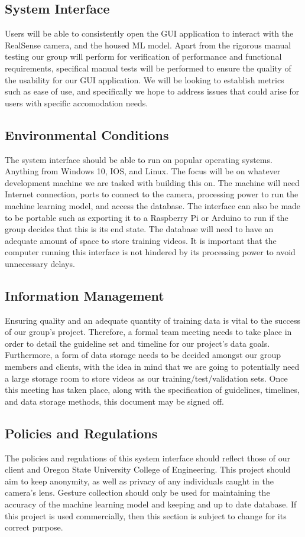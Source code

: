 \documentclass[onecolumn, draftclsnofoot,10pt, compsoc]{IEEEtran}
\begin{document}
\subsection{System Interface}
Users will be able to consistently open the GUI application to interact with the RealSense camera, and the housed ML model. Apart from the rigorous manual testing our group will perform for verification of performance and functional requirements, specifical manual tests will be performed to ensure the quality of the usability for our GUI application. We will be looking to establish metrics such as ease of use, and specifically we hope to address issues that could arise for users with specific accomodation needs.
\subsection{Environmental Conditions}
The system interface should be able to run on popular operating systems.  Anything from Windows 10, IOS, and Linux.  The focus will be on whatever development machine we are tasked with building this on.  The machine will need Internet connection, ports to connect to the camera, processing power to run the machine learning model, and access the database.  The interface can also be made to be portable such as exporting it to a Raspberry Pi or Arduino to run if the group decides that this is its end state.  The database will need to have an adequate amount of space to store training videos.  It is important that the computer running this interface is not hindered by its processing power to avoid unnecessary delays.

\subsection{Information Management}
Ensuring quality and an adequate quantity of training data is vital to the success of our group’s project. Therefore, a formal team meeting needs to take place in order to detail the guideline set and timeline for our project’s data goals. Furthermore, a form of data storage needs to be decided amongst our group members and clients, with the idea in mind that we are going to potentially need a large storage room to store videos as our training/test/validation sets. Once this meeting has taken place, along with the specification of guidelines, timelines, and data storage methods, this document may be signed off.

\subsection{Policies and Regulations}
The policies and regulations of this system interface should reflect those of our client and Oregon State University College of Engineering. This project should aim to keep anonymity, as well as privacy of any individuals caught in the camera's lens. Gesture collection should only be used for maintaining the accuracy of the machine learning model and keeping and up to date database. If this project is used commercially, then this section is subject to change for its correct purpose. 
\end{document}
